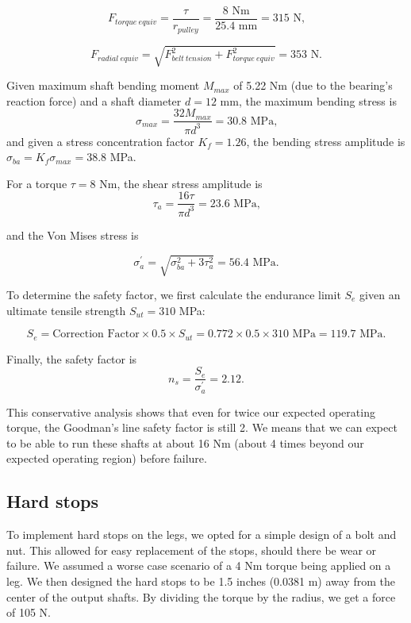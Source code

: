 \documentclass{report}
\begin{document}
\begin{equation}
F_{torque\ equiv} = \frac{\tau}{r_{pulley}} = \frac{8\text{ Nm}}{25.4\text{ mm}} = 315\text{ N,}
\end{equation}

\begin{equation}
F_{radial\ equiv} = \sqrt{F_{belt\ tension}^2 + F_{torque\ equiv}^2} = 353\text{ N.}
\end{equation}

Given maximum shaft bending moment $M_{max}$ of 5.22 Nm (due to the bearing's reaction force) and a shaft diameter $d = 12$ mm, the maximum bending stress is
\begin{equation}
\sigma_{max} = \frac{32 M_{max}}{\pi d^3} = 30.8\text{ MPa,}
\end{equation}
and given a stress concentration factor $K_f = 1.26$, the bending stress amplitude is $\sigma_{ba} = K_f \sigma_{max} = 38.8$ MPa.

For a torque $\tau =  8$ Nm, the shear stress amplitude is
\begin{equation}
\tau_a = \frac{16\tau}{\pi d^3} = 23.6 \text{ MPa,}
\end{equation}

and the Von Mises stress is

\begin{equation}
\sigma_a^{'} = \sqrt{\sigma_{ba}^2 + 3\tau_a^2} = 56.4\text{ MPa.}
\end{equation}

To determine the safety factor, we first calculate the endurance limit $S_e$ given an ultimate tensile strength $S_{ut} = 310$ MPa:

\begin{equation}
S_e = \text{Correction Factor}\times 0.5\times S_{ut} = 0.772\times 0.5\times 310\text{ MPa} = 119.7\text{ MPa}.
\end{equation}

Finally, the safety factor is
\begin{equation}
n_s = \frac{S_e}{\sigma_a^{'}} = 2.12.
\end{equation}

This conservative analysis shows that even for twice our expected operating torque, the Goodman's line safety factor is still 2.  We means that we can expect to be able to run these shafts at about 16 Nm (about 4 times beyond our expected operating region) before failure.

\subsection[Hard stops]{Hard stops}
To implement hard stops on the legs, we opted for a simple design of a bolt and nut. This allowed for easy replacement of the stops, should there be wear or failure. We assumed a worse case scenario of a 4 Nm torque being applied on a leg. We then designed the hard stops to be  1.5 inches (0.0381 m) away from the center of the output shafts. By dividing the torque by the radius, we get a force of 105 N.
\end{document}
